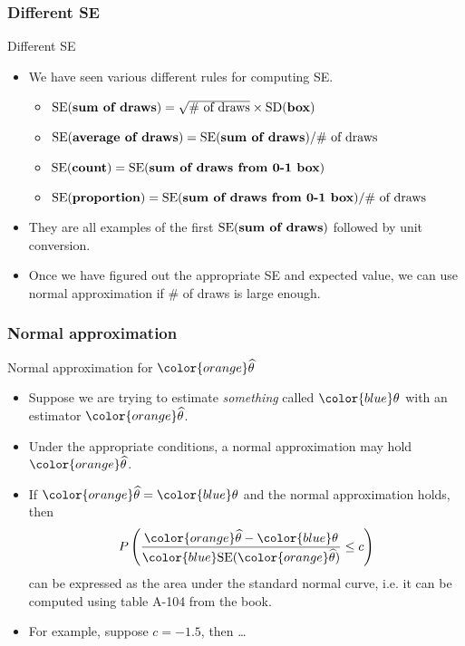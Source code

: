\documentclass[handout]{beamer}
\begin{document}

   \begin{frame} \frametitle{Different SE}

   \begin{block}
     {Different SE}
     \begin{itemize}
     \item We have seen various different rules for computing SE.
       \begin{itemize}
       \item $\text{SE({\bf sum of draws})} = \sqrt{\text{$\#$ of draws}} \times \text{SD}({\bf box})$
       \item $\text{SE({\bf average of draws})} = \text{SE({\bf sum of draws})} / \text{$\#$ of draws}$
       \item $\text{SE}({\bf count}) =  \text{SE({\bf sum of draws from 0-1 box})}$
       \item $\text{SE({\bf proportion})} =  \text{SE({\bf sum of draws from 0-1 box})} / {\text{$\#$ of draws}}$
       \end{itemize}
     \item They are all examples of the first $\text{SE({\bf sum of draws})}$ followed by unit conversion.
      \item Once we have figured out the appropriate SE and expected value,
     we can use normal approximation if $\#$ of draws is large enough.
     \end{itemize}
   \end{block}
   \end{frame}


   \begin{frame} \frametitle{Normal approximation}

   \begin{block}
     {Normal approximation for ${\color{orange} \widehat{\theta}}$}
     \begin{itemize}
     \item Suppose we are trying to estimate {\em something} called
     ${\color{blue} \theta}$ with an estimator ${\color{orange} \widehat{\theta}}$.
     \item Under the appropriate conditions, a normal approximation may hold ${\color{orange} \widehat{\theta}}$.
     \item If ${\color{orange} \widehat{\theta}} = {\color{blue} \theta}$ and the normal approximation holds, then
     $$
     P \left(\frac{{\color{orange}  \widehat{\theta}} - {\color{blue} \theta}}{{{\color{blue} \text{SE}}} ({\color{orange} \widehat{\theta}})} \leq c \right)
     $$
     can be expressed as the area under the standard normal curve, i.e.
     it can be computed using table A-104 from the book.
     \item For example, suppose $c=-1.5$, then \dots

     \end{itemize}
   \end{block}
   \end{frame}
\end{document}
